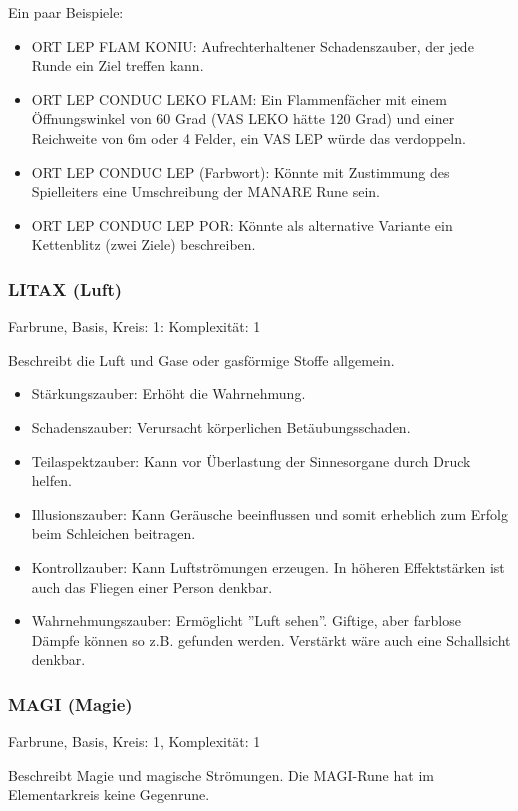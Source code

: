 \documentclass{article}
\begin{document}
Ein paar Beispiele:

\begin{itemize}
\item ORT LEP FLAM KONIU: Aufrechterhaltener Schadenszauber, der jede Runde ein Ziel treffen kann.
\item ORT LEP CONDUC LEKO FLAM: Ein Flammenfächer mit einem Öffnungswinkel von 60 Grad (VAS LEKO hätte 120 Grad) und einer Reichweite von 6m oder 4 Felder, ein VAS LEP würde das verdoppeln.
\item ORT LEP CONDUC LEP (Farbwort): Könnte mit Zustimmung des Spielleiters eine Umschreibung der MANARE Rune sein.
\item ORT LEP CONDUC LEP POR: Könnte als alternative Variante ein Kettenblitz (zwei Ziele) beschreiben.
\end{itemize}

\subsubsection{LITAX (Luft)}

Farbrune, Basis, Kreis: 1: Komplexität: 1

Beschreibt die Luft und Gase oder gasförmige Stoffe allgemein.

\begin{itemize}
\item Stärkungszauber: Erhöht die Wahrnehmung.
\item Schadenszauber: Verursacht körperlichen Betäubungsschaden.
\item Teilaspektzauber: Kann vor Überlastung der Sinnesorgane durch Druck helfen.
\item Illusionszauber: Kann Geräusche beeinflussen und somit erheblich zum Erfolg beim Schleichen beitragen.
\item Kontrollzauber: Kann Luftströmungen erzeugen. In höheren Effektstärken ist auch das Fliegen einer Person denkbar.
\item Wahrnehmungszauber: Ermöglicht ''Luft sehen''. Giftige, aber farblose Dämpfe können so z.B. gefunden werden. Verstärkt wäre auch eine Schallsicht denkbar.
\end{itemize}

\subsubsection{MAGI (Magie)}

Farbrune, Basis, Kreis: 1, Komplexität: 1

Beschreibt Magie und magische Strömungen. Die MAGI-Rune hat im Elementarkreis keine Gegenrune.
\end{document}
